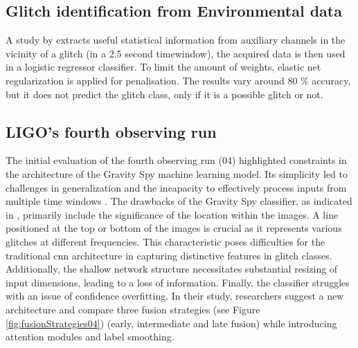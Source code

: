 \subsection{Glitch identification from Environmental data}
A study by \citep{colgan2020efficient} extracts useful statistical information from auxiliary channels in the vicinity of a glitch (in a 2.5 second timewindow), the acquired data is then used in a logistic regressor classifier. To limit the amount of weights, elastic net regularization \citep{zou2005regularization} is applied for penalisation. 
The results vary around 80 \% accuracy, but it does not predict the glitch class, only if it is a possible glitch or not. 
\newpage
\subsection{LIGO's fourth observing run}
The initial evaluation of the fourth observing run (04) highlighted constraints in the architecture of the Gravity Spy machine learning model. Its simplicity led to challenges in generalization and the incapacity to effectively process inputs from multiple time windows \citep{wu2024advancing}. The drawbacks of the Gravity Spy classifier, as indicated in \citep{jarov2023new, alvarez2023gspynettree}, primarily include the significance of the location within the images. A line positioned at the top or bottom of the images is crucial as it represents various glitches at different frequencies. This characteristic poses difficulties for the traditional \acrshort{cnn} architecture in capturing distinctive features in glitch classes. Additionally, the shallow network structure necessitates substantial resizing of input dimensions, leading to a loss of information. Finally, the classifier struggles with an issue of confidence overfitting. In their study, researchers \citep{wu2024advancing} suggest a new architecture and compare three fusion strategies (see Figure \ref{fig:fusionStrategies04}) (early, intermediate and late fusion) while introducing attention modules and label smoothing.

